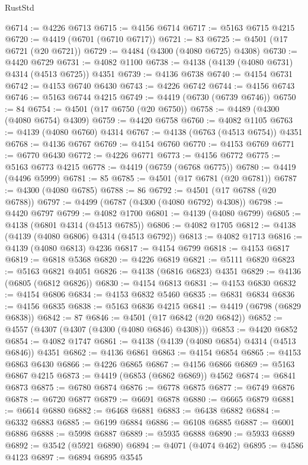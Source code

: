 \begin{lexlean}{RustStd}
\begin{coremodule}
@6714 := @4226 @6713
@6715 := @4156 @6714
@6717 := @5163 @6715 @4215
@6720 := @4419 (@6701 (@6710 @6717))
@6721 := 83
@6725 := @4501 (@17 @6721 (@20 @6721))
@6729 := @4484 (@4300 (@4080 @6725) @4308)
@6730 := @4420 @6729
@6731 := @4082 @1100
@6738 := @4138 (@4139 (@4080 @6731) @4314 (@4513 @6725)) @4351
@6739 := @4136 @6738
@6740 := @4154 @6731
@6742 := @4153 @6740 @6430
@6743 := @4226 @6742
@6744 := @4156 @6743
@6746 := @5163 @6744 @4215
@6749 := @4419 (@6730 (@6739 @6746))
@6750 := 84
@6754 := @4501 (@17 @6750 (@20 @6750))
@6758 := @4489 (@4300 (@4080 @6754) @4309)
@6759 := @4420 @6758
@6760 := @4082 @1105
@6763 := @4139 (@4080 @6760) @4314
@6767 := @4138 (@6763 (@4513 @6754)) @4351
@6768 := @4136 @6767
@6769 := @4154 @6760
@6770 := @4153 @6769
@6771 := @6770 @6430
@6772 := @4226 @6771
@6773 := @4156 @6772
@6775 := @5163 @6773 @4215
@6778 := @4419 (@6759 (@6768 @6775))
@6780 := @4419 (@4496 @5999)
@6781 := 85
@6785 := @4501 (@17 @6781 (@20 @6781))
@6787 := @4300 (@4080 @6785)
@6788 := 86
@6792 := @4501 (@17 @6788 (@20 @6788))
@6797 := @4499 (@6787 (@4300 (@4080 @6792) @4308))
@6798 := @4420 @6797
@6799 := @4082 @1700
@6801 := @4139 (@4080 @6799)
@6805 := @4138 (@6801 @4314 (@4513 @6785))
@6806 := @4082 @1705
@6812 := @4138 (@4139 (@4080 @6806) @4314 (@4513 @6792))
@6813 := @4082 @1713
@6816 := @4139 (@4080 @6813) @4236
@6817 := @4154 @6799
@6818 := @4153 @6817
@6819 := @6818 @5368
@6820 := @4226 @6819
@6821 := @5111 @6820
@6823 := @5163 @6821 @4051
@6826 := @4138 (@6816 @6823) @4351
@6829 := @4136 (@6805 (@6812 @6826))
@6830 := @4154 @6813
@6831 := @4153 @6830
@6832 := @4154 @6806
@6834 := @4153 @6832 @5460
@6835 := @6831 @6834
@6836 := @4156 @6835
@6838 := @5163 @6836 @4215
@6841 := @4419 (@6798 (@6829 @6838))
@6842 := 87
@6846 := @4501 (@17 @6842 (@20 @6842))
@6852 := @4557 (@4307 (@4307 (@4300 (@4080 @6846) @4308)))
@6853 := @4420 @6852
@6854 := @4082 @1747
@6861 := @4138 (@4139 (@4080 @6854) @4314 (@4513 @6846)) @4351
@6862 := @4136 @6861
@6863 := @4154 @6854
@6865 := @4153 @6863 @6430
@6866 := @4226 @6865
@6867 := @4156 @6866
@6869 := @5163 @6867 @4215
@6873 := @4419 (@6853 (@6862 @6869)) @4562
@6874 := @6841 @6873
@6875 := @6780 @6874
@6876 := @6778 @6875
@6877 := @6749 @6876
@6878 := @6720 @6877
@6879 := @6691 @6878
@6880 := @6665 @6879
@6881 := @6614 @6880
@6882 := @6468 @6881
@6883 := @6438 @6882
@6884 := @6332 @6883
@6885 := @6199 @6884
@6886 := @6108 @6885
@6887 := @6001 @6886
@6888 := @5998 @6887
@6889 := @5935 @6888
@6890 := @5933 @6889
@6892 := @3542 (@5921 @6890)
@6894 := @4071 (@4074 @462)
@6895 := @4586 @4123
@6897 := @6894 @6895 @3545

\end{coremodule}
\end{lexlean}
